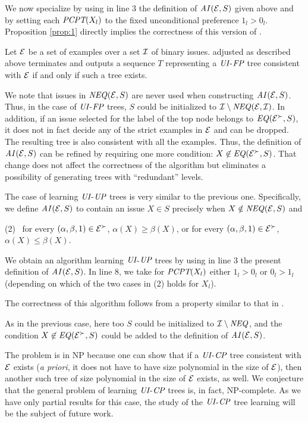 We now specialize  by using in line 3 the 
definition of $\mathit{AI}(\mathcal{E},S)$ given above and by setting each $\textit{PCPT}(X_l)$ 
to the fixed unconditional preference $1_l>0_l$. Proposition \ref{prop:1}
directly implies the correctness of this version of .

\begin{thm}
Let $\mathcal{E}$ be a set of examples over a set $\mathcal{I}$ of binary issues.
 adjusted as described above terminates and outputs
a sequence $T$ representing a $\textit{UI}$-$\textit{FP}$ tree consistent with $\mathcal{E}$ if
and only if such a tree exists.
\end{thm}

We note that issues in $\mathit{NEQ}(\mathcal{E},S)$ are never used when constructing
$\mathit{AI}(\mathcal{E},S)$. Thus, in the case of $\textit{UI}$-$\textit{FP}$ trees, $S$ could be
initialized to $\mathcal{I}\setminus\mathit{NEQ}(\mathcal{E},\mathcal{I})$. In addition, if an issue
selected for the label of the top node belongs to $\mathit{EQ}(\mathcal{E}^\succ, S)$,
it does not in fact decide any of the strict examples in $\mathcal{E}$ and can be
dropped. The resulting tree is also consistent with all the examples. 
Thus, the definition of $\mathit{AI}(\mathcal{E},S)$ can be refined by requiring one more
condition: $X \not \in \mathit{EQ}(\mathcal{E}^\succ, S)$. That change does not affect 
the correctness of the algorithm but eliminates a possibility of generating
trees with ``redundant'' levels.


The case of learning $\textit{UI}$-$\textit{UP}$ trees is very similar to the 
previous one. Specifically, we define $\mathit{AI}(\mathcal{E},S)$ to contain an issue 
$X\in S$ precisely when $X\notin\mathit{NEQ}(\mathcal{E},S)$ and

\noindent 
(2) \ for every $(\alpha,\beta,1) \in \mathcal{E}^\succ$, $\alpha(X) \geq 
\beta(X)$, or for every $(\alpha,\beta,1) \in \mathcal{E}^\succ$, $\alpha(X) \leq \beta(X)$.

We obtain an algorithm learning $\textit{UI}$-$\textit{UP}$ trees by using in line 3
the present definition of $\mathit{AI}(\mathcal{E},S)$. In line 8, we take for 
$\textit{PCPT}(X_l)$ either $1_l>0_l$ or $0_l>1_l$ (depending on which of the two
cases in (2) holds for $X_l$).

The correctness of this algorithm follows from a property similar to
that in .

As in the previous case, here too $S$ could be initialized to $\mathcal{I} \setminus
\mathit{NEQ}$, and the condition $X\not\in \mathit{EQ}(\mathcal{E}^\succ,S)$ could be added to the 
definition of $\mathit{AI}(\mathcal{E},S)$. 

The problem is in NP because one can show that if a $\textit{UI}$-$\textit{CP}$
tree consistent with $\mathcal{E}$ exists (\emph{a priori},
it does not have to have size polynomial in the size of $\mathcal{E}$), then another
such tree of size polynomial in the size of $\mathcal{E}$ exists, as well.
We conjecture that the general problem of
learning $\textit{UI}$-$\textit{CP}$ trees is, in fact, NP-complete. 
As we have only partial results 
for this case, the study of the $\textit{UI}$-$\textit{CP}$ tree learning will be the subject
of future work. 


